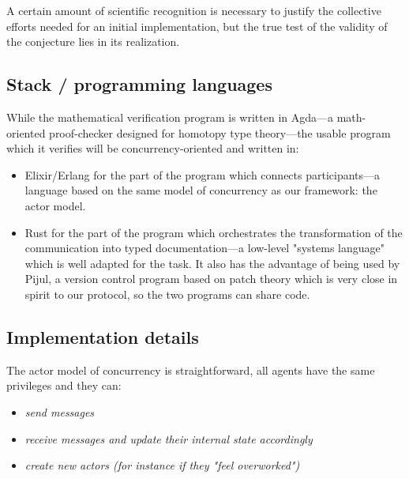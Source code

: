 \documentclass[11pt]{article}
\begin{document}
A certain amount of scientific recognition is necessary to justify the collective efforts needed for an initial implementation, but the true test of the validity of the conjecture lies in its realization.

\subsection{Stack / programming languages}

While the mathematical verification program is written in Agda---a math-oriented proof-checker designed for homotopy type theory---the usable program which it verifies will be concurrency-oriented and written in:

\begin{itemize}

\item Elixir/Erlang for the part of the program which connects participants---a language based on the same model of concurrency as our framework: the actor model.

\item Rust for the part of the program which orchestrates the transformation of the communication into typed documentation---a low-level "systems language" which is well adapted for the task. It also has the advantage of being used by Pijul, a version control program based on patch theory which is very close in spirit to our protocol, so the two programs can share code.

\end{itemize}

\subsection{Implementation details}

The actor model of concurrency is straightforward, all agents have the same privileges and they can:

\begin{itemize}

\item \emph{send messages}

\item \emph{receive messages and update their internal state accordingly}

\item \emph{create new actors (for instance if they "feel overworked")}

\end{itemize}
\end{document}
